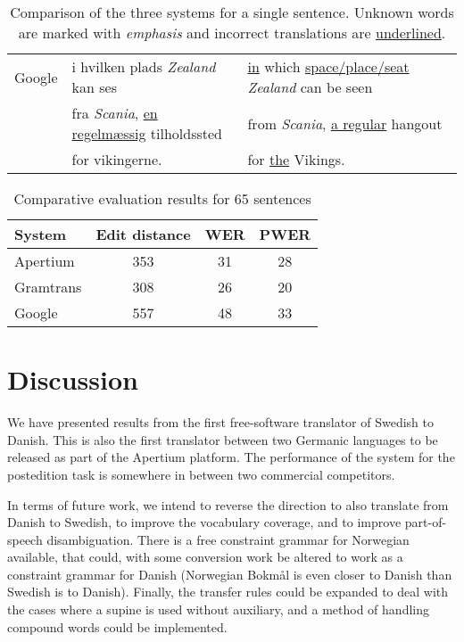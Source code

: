 \documentclass[11pt]{article}
\begin{document}
\begin{table*}
\begin{tabular}{|c|l|l|}
Google     & i hvilken plads \emph{Zealand} kan ses           & \underline{in} which \underline{space/place/seat} \emph{Zealand} can be seen \\ 
~          & fra \emph{Scania}, \underline{en regelmæssig} tilholdssted   & from \emph{Scania}, \underline{a regular} hangout \\
~          & for vikingerne.                                  & for \underline{the} Vikings. \\
\hline 
\end{tabular}
 \label{table:extranslations}
 \caption{Comparison of the three systems for a single sentence. Unknown words are marked with \emph{emphasis} and
     incorrect translations are \underline{underlined}.}
\end{table*}

\begin{table}
\centering
\begin{tabular}{|l|c|c|c|}
\hline
System & Edit distance & WER & PWER\\
\hline
Apertium  & 353   & 31    & 28 \\
Gramtrans & 308   & 26    & 20 \\
Google    & 557   & 48    & 33 \\
\hline
\end{tabular}
    \caption{Comparative evaluation results for 65 sentences}
    \label{table:compeval}
\end{table}

\section{Discussion}

We have presented results from the first free-software translator of Swedish to Danish. This
is also the first translator between two Germanic languages to be released as part of the 
Apertium platform. The performance of the system for the postedition task is somewhere in between 
two commercial competitors. 

In terms of future work, we intend to reverse the direction to also translate from Danish to 
Swedish, to improve the vocabulary coverage, and to improve part-of-speech disambiguation. There
is a free constraint grammar for Norwegian \citep{hagen2000cbt} available, that could, with some
conversion work be altered to work as a constraint grammar for Danish (Norwegian Bokmål is even
closer to Danish than Swedish is to Danish). Finally, the transfer rules could be expanded to 
deal with the cases where a supine is used without auxiliary, and a method of handling compound
words could be implemented.
\end{document}
